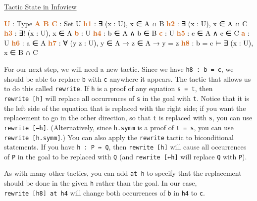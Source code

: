 \documentclass[
  letterpaper,
  DIV=11,
  numbers=noendperiod]{scrreprt}
\newenvironment{Shaded}{\begin{snugshade}}{\end{snugshade}}
\newcommand{\InformationTok}[1]{\textcolor[rgb]{0.37,0.37,0.37}{#1}}
\newcommand{\NormalTok}[1]{\textcolor[rgb]{0.00,0.23,0.31}{#1}}
\newcommand{\SpecialCharTok}[1]{\textcolor[rgb]{0.37,0.37,0.37}{#1}}
\renewcommand{\NormalTok}[1]{\textcolor[HTML]{000000}{#1}}
\renewcommand{\SpecialCharTok}[1]{}
\renewcommand{\InformationTok}[1]{\textcolor[HTML]{D2691E}{\textbf{#1}}}
\newcommand{\nobreakShaded}{\renewenvironment{Shaded}
	{\begin{tcolorbox}[frame hidden, enhanced, interior hidden, boxrule=0pt,
		borderline west={3pt}{0pt}{shadecolor}, sharp corners]}
	{\end{tcolorbox}}}
\newenvironment{outpt}
	{\nobreakShaded\begin{minipage}[t]{0.32\textwidth}
		\uline{Tactic State in Infoview}}
	{\end{minipage}}
\theoremstyle{remark}
\begin{document}
\begin{outpt}

\begin{Shaded}
\begin{Highlighting}[]
\InformationTok{U }\NormalTok{: Type}
\InformationTok{A B C }\NormalTok{: Set U}
\InformationTok{h1 }\NormalTok{: ∃ (x : U),}
\SpecialCharTok{\textgreater{}\textgreater{}}\NormalTok{  x ∈ A ∩ B}
\InformationTok{h2 }\NormalTok{: ∃ (x : U),}
\SpecialCharTok{\textgreater{}\textgreater{}}\NormalTok{  x ∈ A ∩ C}
\InformationTok{h3 }\NormalTok{: ∃! (x : U), x ∈ A}
\InformationTok{b }\NormalTok{: U}
\InformationTok{h4 }\NormalTok{: b ∈ A ∧ b ∈ B}
\InformationTok{c }\NormalTok{: U}
\InformationTok{h5 }\NormalTok{: c ∈ A ∧ c ∈ C}
\InformationTok{a }\NormalTok{: U}
\InformationTok{h6 }\NormalTok{: a ∈ A}
\InformationTok{h7 }\NormalTok{: ∀ (y z : U),}
\SpecialCharTok{\textgreater{}\textgreater{}}\NormalTok{  y ∈ A → z ∈ A → y = z}
\InformationTok{h8 }\NormalTok{: b = c}
\NormalTok{⊢ ∃ (x : U), x ∈ B ∩ C}
\end{Highlighting}
\end{Shaded}

\end{outpt}

For our next step, we will need a new tactic. Since we have
\texttt{h8\ :\ b\ =\ c}, we should be able to replace \texttt{b} with
\texttt{c} anywhere it appears. The tactic that allows us to do this
called \texttt{rewrite}. If \texttt{h} is a proof of any equation
\texttt{s\ =\ t}, then \texttt{rewrite\ {[}h{]}} will replace all
occurrences of \texttt{s} in the goal with \texttt{t}. Notice that it is
the left side of the equation that is replaced with the right side; if
you want the replacement to go in the other direction, so that
\texttt{t} is replaced with \texttt{s}, you can use
\texttt{rewrite\ {[}←h{]}}. (Alternatively, since \texttt{h.symm} is a
proof of \texttt{t\ =\ s}, you can use \texttt{rewrite\ {[}h.symm{]}}.)
You can also apply the \texttt{rewrite} tactic to biconditional
statements. If you have \texttt{h\ :\ P\ ↔\ Q}, then
\texttt{rewrite\ {[}h{]}} will cause all occurrences of \texttt{P} in
the goal to be replaced with \texttt{Q} (and \texttt{rewrite\ {[}←h{]}}
will replace \texttt{Q} with \texttt{P}).

As with many other tactics, you can add \texttt{at\ h\textquotesingle{}}
to specify that the replacement should be done in the given
\texttt{h\textquotesingle{}} rather than the goal. In our case,
\texttt{rewrite\ {[}h8{]}\ at\ h4} will change both occurrences of
\texttt{b} in \texttt{h4} to \texttt{c}.
\end{document}
